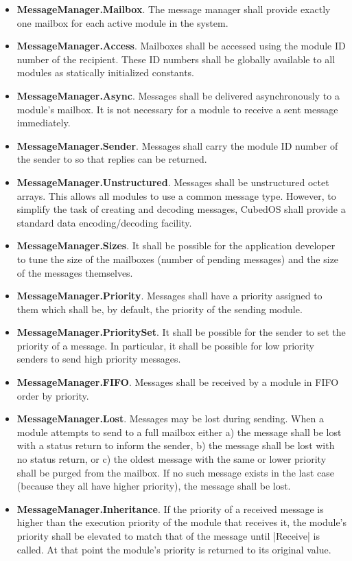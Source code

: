 \begin{itemize}
\item \textbf{MessageManager.Mailbox}. The message manager shall provide exactly one mailbox for
  each active module in the system.
\item \textbf{MessageManager.Access}. Mailboxes shall be accessed using the module ID number of
  the recipient. These ID numbers shall be globally available to all modules as statically
  initialized constants.
\item \textbf{MessageManager.Async}. Messages shall be delivered asynchronously to a module's
  mailbox. It is not necessary for a module to receive a sent message immediately.
\item \textbf{MessageManager.Sender}. Messages shall carry the module ID number of the sender to
  so that replies can be returned.
\item \textbf{MessageManager.Unstructured}. Messages shall be unstructured octet arrays. This
  allows all modules to use a common message type. However, to simplify the task of creating and
  decoding messages, CubedOS shall provide a standard data encoding/decoding facility.
\item \textbf{MessageManager.Sizes}. It shall be possible for the application developer to tune
  the size of the mailboxes (number of pending messages) and the size of the messages
  themselves.
\item \textbf{MessageManager.Priority}. Messages shall have a priority assigned to them which
  shall be, by default, the priority of the sending module.
\item \textbf{MessageManager.PrioritySet}. It shall be possible for the sender to set the
  priority of a message. In particular, it shall be possible for low priority senders to send
  high priority messages. 
\item \textbf{MessageManager.FIFO}. Messages shall be received by a module in FIFO order by
  priority.
\item \textbf{MessageManager.Lost}. Messages may be lost during sending. When a module attempts
  to send to a full mailbox either a) the message shall be lost with a status return to inform
  the sender, b) the message shall be lost with no status return, or c) the oldest message with
  the same or lower priority shall be purged from the mailbox. If no such message exists in the
  last case (because they all have higher priority), the message shall be lost.
\item \textbf{MessageManager.Inheritance}. If the priority of a received message is higher than
  the execution priority of the module that receives it, the module's priority shall be
  elevated to match that of the message until |Receive| is called. At that point the module's
  priority is returned to its original value. 
\end{itemize}

